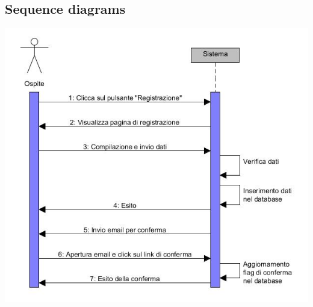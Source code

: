 \documentclass[a4paper,12pt]{article}
\begin{document}
\subsection{Sequence diagrams}
\begin{flushleft}
\includegraphics[scale=0.8]{sDiagrams/creazioneUtente.jpg}


\end{flushleft}
\end{document}
